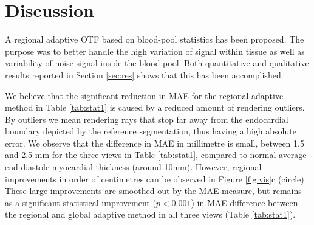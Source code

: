 
\section{Discussion}
A regional adaptive OTF based on blood-pool statistics has been proposed. The purpose was to better handle the high variation of signal within tissue as well as variability of noise signal inside the blood pool. Both quantitative and qualitative results reported in Section \ref{sec:res} shows that this has been accomplished. 

We believe that the significant reduction in MAE for the regional adaptive method in Table \ref{tab:stat1} is caused by a reduced amount of rendering outliers. By outliers we mean rendering rays that stop far away from the endocardial boundary depicted by the reference segmentation, thus having a high absolute error. We observe that the difference in MAE in millimetre is small, between 1.5 and 2.5 mm for the three views in Table \ref{tab:stat1}, compared to normal average end-diastole myocardial thickness (around 10mm). However, regional improvements in order of centimetres can be observed in Figure \ref{fig:vis}c (circle). These large improvements are smoothed out by the MAE measure, but remains as a significant statistical improvement ($p<0.001$) in MAE-difference between the regional and global adaptive method in all three views (Table \ref{tab:stat1}).

